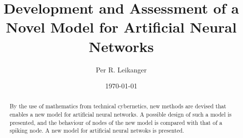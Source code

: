 \documentclass[b5paper,11 pt]{report}
\author{Per R. Leikanger}
\title{Development and Assessment of a Novel Model for Artificial Neural Networks}
\date{\today}
\begin{document}
   

\maketitle

\begin{abstract}
By the use of mathematics from technical cybernetics, new methods are devised that enables a new model for artificial neural networks.
A possible design of such a model is presented, and the behaviour of nodes of the new model is compared with that of a spiking node.
A new model for artificial neural netwoks is presented.
\end{abstract}


%
%
\end{document}
